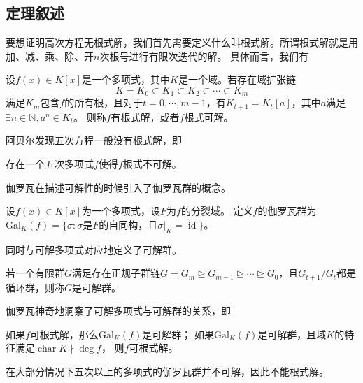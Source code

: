 \documentclass[main]{subfiles}
\newcommand{\gal}{\mathrm{Gal}}
\newcommand{\id}{\mathop{\mathrm{id}}}
\renewcommand{\char}{\mathop{\mathrm{char}}}
\begin{document}
\subsection{定理叙述}
要想证明高次方程无根式解，我们首先需要定义什么叫根式解。所谓根式解就是用加、减、乘、除、开\(n\)次根号进行有限次迭代的解。
具体而言，我们有
\begin{defination}\label{def:1}
	设\(f( x) \in K[ x]\)是一个多项式，其中\(K\)是一个域。若存在域扩张链
	\[
		K=K_0 \subset K_1 \subset K_2 \subset \cdots \subset K_m
	\]
	满足\(K_m\)包含\(f\)的所有根，且对于\(t=0,\cdots,m-1\)，有\(K_{t+1}=K_t[ a]\)，其中\(a\)满足\(\exists n \in \mathbb{N},a^n \in K_t\)。
	则称\(f\)有根式解，或者\(f\)根式可解。
\end{defination}
阿贝尔发现五次方程一般没有根式解，即
\begin{theorem}\label{the:1}
	存在一个五次多项式\(f\)使得\(f\)根式不可解。
\end{theorem}
伽罗瓦在描述可解性的时候引入了伽罗瓦群的概念。
\begin{defination}\label{def:2}
	设\(f( x) \in K[ x]\)为一个多项式，设\(F\)为\(f\)的分裂域。
	定义\(f\)的伽罗瓦群为\(\gal_K( f)=\{ \sigma :\sigma \text{是}F \text{的自同构，且}\sigma|_K=\id\}\)。
\end{defination}
同时与可解多项式对应地定义了可解群。
\begin{defination}\label{def:3}
	若一个有限群\(G\)满足存在正规子群链\(G=G_m \unrhd G_{m-1} \unrhd \cdots \unrhd G_0\)，且\(G_{t+1} / G_t\)都是循环群，则称\(G\)是可解群。
\end{defination}
伽罗瓦神奇地洞察了可解多项式与可解群的关系，即
\begin{theorem}\label{the:2}
	如果\(f\)可根式解，那么\(\gal_K( f)\)是可解群；
	如果\(\gal_K( f)\)是可解群，且域\(K\)的特征满足\(\char K \nmid \deg f\)， 则\(f\)可根式解。
\end{theorem}
在大部分情况下五次以上的多项式的伽罗瓦群并不可解，因此不能根式解。
\end{document}
